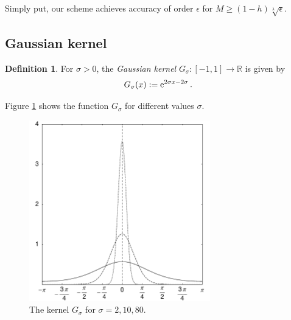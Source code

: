 \documentclass[11pt,a4paper,twoside,bibtotoc]{scrartcl}
\theoremstyle{plain}
\theoremstyle{definition}
\newtheorem{definition}[theorem]{Definition}
\theoremstyle{remark}
\newcommand{\R}{\ensuremath{\mathbb{R}}}
\newcommand{\interv}[4]{\ensuremath{\left#1\left.#2,#3\right#4\right.}}
\newcommand{\fun}[2]{\ensuremath{#1{\hspace{-0.4ex}}\left(#2\right)}}
\newcommand{\e}{\mbox{\rm{e}}}
\numberwithin{equation}{section}
\numberwithin{table}{section}
\numberwithin{figure}{section}
\begin{document}
Simply put, our scheme achieves accuracy of order $\epsilon$ for $M \ge
(1-h)\sqrt[\lambda]{\epsilon}$.

\subsection{Gaussian kernel}
\begin{definition}
  For $\sigma>0$, the \emph{Gaussian kernel}
  $G_{\sigma}:\interv{[}{-1}{1}{]} \rightarrow \R$ is given by
  \begin{equation}
    \label{GaussKernel}
    \nonumber
    \fun{G_{\sigma}}{x} := \e^{2\sigma x-2\sigma}\,.
  \end{equation}
\end{definition}

Figure \ref{Basics:Figure:GKernel} shows the function $G_{\sigma}$ for
different values $\sigma$.
\begin{figure}[tb]
  \centering
  \includegraphics[width=0.7\textwidth]{images/gaussian}
  \caption{The kernel $G_{\sigma}$ for $\sigma = 2,10,80$.}
  \label{Basics:Figure:GKernel}
\end{figure}
\end{document}

